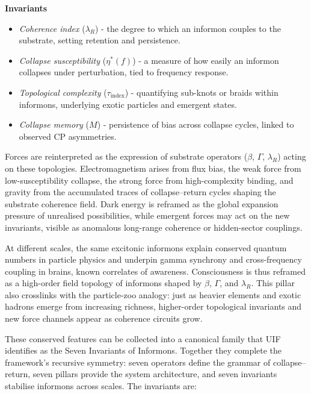 \noindent
\textbf{Invariants} 
\begin{itemize}[leftmargin=*]
\item \textit{Coherence index} ($\lambda_R$) - the degree to which an informon couples to the substrate, setting retention and persistence.
\item \textit{Collapse susceptibility} ($\eta^{*}(f)$) - a measure of how easily an informon collapses under perturbation, tied to frequency response.
\item \textit{Topological complexity} ($\tau_{\text{index}}$) -  quantifying sub-knots or braids within informons, underlying exotic particles and emergent states.
\item \textit{Collapse memory} ($M$) -  persistence of bias across collapse cycles, linked to observed CP asymmetries.
\end{itemize}

Forces are reinterpreted as the expression of substrate operators ($\beta$, $\Gamma$, $\lambda_R$) acting on these topologies. Electromagnetism arises from flux bias, the weak force from low-susceptibility collapse, the strong force from high-complexity binding, and gravity from the accumulated traces of collapse–return cycles shaping the substrate coherence field. Dark energy is reframed as the global expansion pressure of unrealised possibilities, while emergent forces may act on the new invariants, visible as anomalous long-range coherence or hidden-sector couplings.

At different scales, the same excitonic informons explain conserved quantum numbers in particle physics and underpin gamma synchrony and cross-frequency coupling in brains, known correlates of awareness. Consciousness is thus reframed as a high-order field topology of informons shaped by $\beta$, $\Gamma$, and $\lambda_R$.
This pillar also crosslinks with the particle-zoo analogy: just as heavier elements and exotic hadrons emerge from increasing richness, higher-order topological invariants and new force channels appear as coherence circuits grow.

These conserved features can be collected into a canonical family that UIF identifies as the Seven Invariants of Informons. Together they complete the framework’s recursive symmetry: seven operators define the grammar of collapse–return, seven pillars provide the system architecture, and seven invariants stabilise informons across scales. The invariants are:
\newline
\newline


